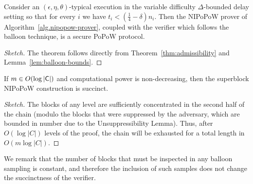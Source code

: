 \begin{theorem}[Security]
   Consider an $(\epsilon, \eta, \theta)$-typical execution in the variable
   difficulty $\Delta$-bounded delay setting so that for every $i$
   we have $t_i < (\frac{1}{4} - \delta)n_i$.
   Then the NIPoPoW prover of Algorithm~\ref{alg.nipopow-prover},
   coupled with the verifier which follows the balloon technique, is
   a secure PoPoW protocol.
\end{theorem}
\begin{proof}[Sketch]
  The theorem follows directly from Theorem~\ref{thm:admissibility} and
  Lemma~\ref{lem:balloon-bounds}.
\end{proof}
%

\begin{theorem}[Succinctness]
  If $m \in O(\log|\mathsf{C}|)$ and computational power is non-decreasing, then
  the superblock NIPoPoW construction is succinct.
\end{theorem}
\begin{proof}[Sketch]
The blocks of any level are
sufficiently concentrated in the second half of the chain (modulo the blocks
that were suppressed by the adversary, which are bounded in number due to the
Unsuppressibility Lemma). Thus, after $O(\log|C|)$ levels of the proof, the
chain will be exhausted for a total length in $O(m\log|C|)$.
\end{proof}

We remark that the number of blocks that must be inspected in any balloon
sampling is constant, and therefore the inclusion of such samples does not
change the succinctness of the verifier.
